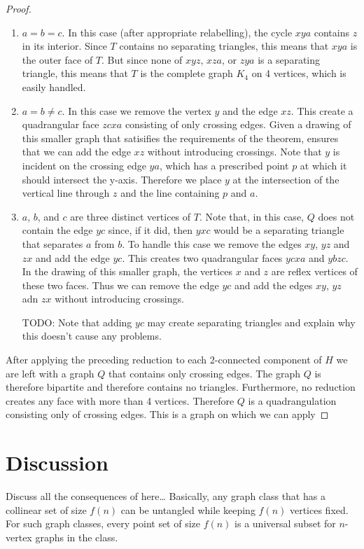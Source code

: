 \documentclass{patmorin}
\begin{document}
\begin{proof}
\begin{enumerate}
\begin{enumerate}
          \item $a=b=c$.  In this case (after appropriate relabelling),
            the cycle $xya$ contains $z$ in its interior.  Since $T$
            contains no separating triangles, this means that $xya$
            is the outer face of $T$. But since none of $xyz$, $xza$,
            or $zya$ is a separating triangle, this means that $T$ is the
            complete graph $K_4$ on 4 vertices, which is easily handled.
          \item $a=b\neq c$. In this case we remove the vertex $y$
            and the edge $xz$.  This create a quadrangular face $zcxa$
            consisting of only crossing edges.  Given a drawing of
            this smaller graph that satisifies the requirements of the
            theorem,  ensures that we can add the edge $xz$
            without introducing crossings.  Note that $y$ is incident
            on the crossing edge $ya$, which has a prescribed point $p$
            at which it should intersect the y-axis.  Therefore we place
            $y$ at the intersection of the vertical line through $z$
            and the line containing $p$ and $a$.
          \item $a$, $b$, and $c$ are three distinct vertices of $T$.
            Note that, in this case, $Q$ does not contain the edge $yc$
            since, if it did, then $yxc$ would be a separating triangle
            that separates $a$ from $b$.  To handle this case we remove
            the edges $xy$, $yz$ and $zx$ and add the edge $yc$.
            This creates two quadrangular faces $ycxa$ and $ybzc$.
            In the drawing of this smaller graph, the vertices $x$ and
            $z$ are reflex vertices of these two faces.  Thus we can
            remove the edge $yc$ and add the edges $xy$, $yz$ adn $zx$
            without introducing crossings.

            TODO: Note that adding $yc$ may create separating triangles and explain why this doesn't cause any problems.
      \end{enumerate}
   \end{enumerate}
   After applying the preceding reduction to each 2-connected component
   of $H$ we are left with a graph $Q$ that contains only crossing
   edges.  The graph $Q$ is therefore bipartite and therefore contains
   no triangles.  Furthermore, no reduction creates any face with more
   than 4 vertices. Therefore $Q$ is a quadrangulation consisting only
   of crossing edges.  This is a graph on which we can apply 

\end{proof}



\section{Discussion}

Discuss all the consequences of  here\ldots
Basically, any graph class that has a collinear set of size $f(n)$ can 
be untangled while keeping $f(n)$ vertices fixed.  For such graph classes,
every point set of size $f(n)$ is a universal subset for $n$-vertex graphs
in the class.
\end{document}
